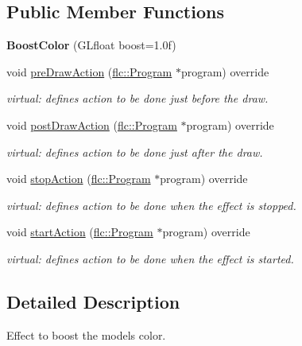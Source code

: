 \subsection*{Public Member Functions}
\begin{DoxyCompactItemize}
\item 
{\bfseries Boost\+Color} (G\+Lfloat boost=1.\+0f)\hypertarget{classflw_1_1flf_1_1BoostColor_a2440c2e5456e839fa68d5b0b7a777383}{}\label{classflw_1_1flf_1_1BoostColor_a2440c2e5456e839fa68d5b0b7a777383}

\item 
void \hyperlink{classflw_1_1flf_1_1BoostColor_a254c40ad807688df7bc7c8a2b8735338}{pre\+Draw\+Action} (\hyperlink{classflw_1_1flc_1_1Program}{flc\+::\+Program} $\ast$program) override
\begin{DoxyCompactList}\small\item\em virtual\+: defines action to be done just before the draw. \end{DoxyCompactList}\item 
void \hyperlink{classflw_1_1flf_1_1BoostColor_a8ef5c9e32f4b210a4240d454021e4408}{post\+Draw\+Action} (\hyperlink{classflw_1_1flc_1_1Program}{flc\+::\+Program} $\ast$program) override
\begin{DoxyCompactList}\small\item\em virtual\+: defines action to be done just after the draw. \end{DoxyCompactList}\item 
void \hyperlink{classflw_1_1flf_1_1BoostColor_a80c34ed26ed847e39fc036baad24e1d5}{stop\+Action} (\hyperlink{classflw_1_1flc_1_1Program}{flc\+::\+Program} $\ast$program) override
\begin{DoxyCompactList}\small\item\em virtual\+: defines action to be done when the effect is stopped. \end{DoxyCompactList}\item 
void \hyperlink{classflw_1_1flf_1_1BoostColor_a4bd0b925fea15ce7fc00296e3d2672e6}{start\+Action} (\hyperlink{classflw_1_1flc_1_1Program}{flc\+::\+Program} $\ast$program) override
\begin{DoxyCompactList}\small\item\em virtual\+: defines action to be done when the effect is started. \end{DoxyCompactList}\end{DoxyCompactItemize}


\subsection{Detailed Description}
Effect to boost the models color. 

